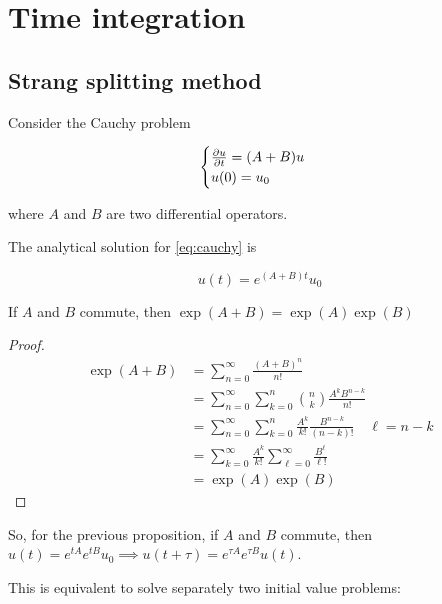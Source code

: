 \section{Time integration}

\subsection{Strang splitting method}

Consider the Cauchy problem

\begin{equation}
    \begin{cases}
        \frac{\partial u}{\partial t} = (A + B) u \\
        u(0) = u_0
    \end{cases}
    \label{eq:cauchy}
\end{equation}

where $A$ and $B$ are two differential operators.

The analytical solution for \eqref{eq:cauchy} is

\[ u(t) = e^{(A + B)t} u_0 \]

\begin{proposition}
    If $A$ and $B$ commute, then $\exp(A+B) = \exp(A)\exp(B)$
\end{proposition}

\begin{proof}
    
    \begin{align*}
        \exp(A + B) &= \sum_{n = 0}^\infty \frac{(A + B)^n}{n!} \\
                    &= \sum_{n = 0}^\infty \sum_{k = 0}^n \binom{n}{k} \frac{A^k B^{n-k}}{n!} \\
                    &= \sum_{n = 0}^\infty \sum_{k = 0}^n \frac{A^k}{k!} \frac{B^{n - k}}{(n - k)!}  \quad \ell = n - k \\
                    &= \sum_{k = 0}^\infty \frac{A^k}{k!} \sum_{\ell = 0}^\infty \frac{B^\ell}{\ell!} \\
                    &= \exp(A)\exp(B)
    \end{align*}

\end{proof}

So, for the previous proposition, if $A$ and $B$ commute, then $u(t) = e^{tA}e^{tB}u_0 \implies u(t + \tau) = e^{\tau A}e^{\tau B}u(t)$.

This is equivalent to solve separately two initial value problems:

